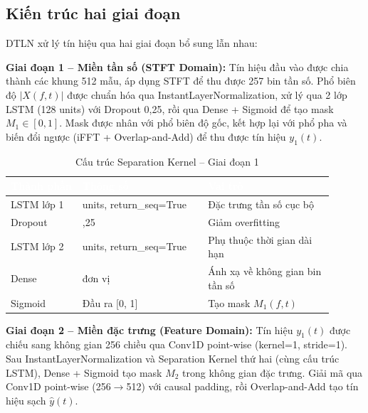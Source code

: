 \subsection{Kiến trúc hai giai đoạn}

DTLN xử lý tín hiệu qua hai giai đoạn bổ sung lẫn nhau:

\textbf{Giai đoạn 1 -- Miền tần số (STFT Domain):}
Tín hiệu đầu vào được chia thành các khung 512 mẫu, áp dụng STFT để thu được
257 bin tần số. Phổ biên độ $|X(f,t)|$ được chuẩn hóa qua InstantLayerNormalization,
xử lý qua 2 lớp LSTM (128 units) với Dropout 0,25, rồi qua Dense + Sigmoid để tạo
mask $M_1 \in [0,1]$. Mask được nhân với phổ biên độ gốc, kết hợp lại với phổ pha
và biến đổi ngược (iFFT + Overlap-and-Add) để thu được tín hiệu $y_1(t)$.

\begin{table}[htbp]
\centering
\caption{Cấu trúc Separation Kernel -- Giai đoạn 1}
\label{tab:sep-kernel}
\begin{tabular}{>{\raggedright\arraybackslash}p{0.2\linewidth} >{\centering\arraybackslash}p{0.35\linewidth} >{\raggedright\arraybackslash}p{0.35\linewidth}}
\toprule
\rowcolor{headerblue} \textcolor{white}{\textbf{Thành phần}} & \textcolor{white}{\textbf{Thông số}} & \textcolor{white}{\textbf{Vai trò}} \\
\midrule
\rowcolor{rowgray} LSTM lớp 1 & 128 units, return\_seq=True & Đặc trưng tần số cục bộ \\
Dropout & 0,25 & Giảm overfitting \\
\rowcolor{rowgray} LSTM lớp 2 & 128 units, return\_seq=True & Phụ thuộc thời gian dài hạn \\
Dense & 257 đơn vị & Ánh xạ về không gian bin tần số \\
\rowcolor{rowgray} Sigmoid & Đầu ra {[}0, 1{]} & Tạo mask $M_1(f,t)$ \\
\bottomrule
\end{tabular}
\end{table}

\textbf{Giai đoạn 2 -- Miền đặc trưng (Feature Domain):}
Tín hiệu $y_1(t)$ được chiếu sang không gian 256 chiều qua Conv1D point-wise
(kernel=1, stride=1). Sau InstantLayerNormalization và Separation Kernel thứ hai
(cùng cấu trúc LSTM), Dense + Sigmoid tạo mask $M_2$ trong không gian đặc trưng.
Giải mã qua Conv1D point-wise (256$\rightarrow$512) với causal padding, rồi Overlap-and-Add
tạo tín hiệu sạch $\hat{y}(t)$.

